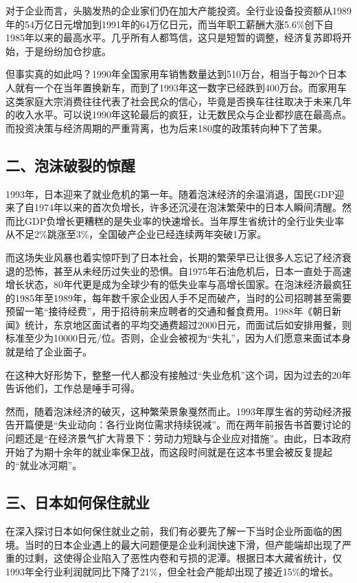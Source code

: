 对于企业而言，头脑发热的企业家们仍在加大产能投资。全行业设备投资额从1989年的54万亿日元增加到1991年的64万亿日元，而当年职工薪酬大涨5.6\%创下自1985年以来的最高水平。几乎所有人都笃信，这只是短暂的调整，经济复苏即将开始，于是纷纷加仓抄底。

但事实真的如此吗？1990年全国家用车销售数量达到510万台，相当于每20个日本人就有一个在当年置换新车，而到了1993年这一数字已经跌到400万台。而家用车这类家庭大宗消费往往代表了社会民众的信心，毕竟是否换车往往取决于未来几年的收入水平。可以说1990年这轮最后的疯狂，让无数民众与企业都抄底在最高点。而投资决策与经济周期的严重背离，也为后来180度的政策转向种下了苦果。

\subsection{二、泡沫破裂的惊醒}

1993年，日本迎来了就业危机的第一年。随着泡沫经济的余温消退，国民GDP迎来了自1974年以来的首次负增长，许多还沉浸在泡沫繁荣中的日本人瞬间清醒。然而比GDP负增长更糟糕的是失业率的快速增长。当年厚生省统计的全行业失业率从不足2\%跳涨至3\%，全国破产企业已经连续两年突破1万家。

而这场失业风暴也着实惊吓到了日本社会，长期的繁荣早已让很多人忘记了经济衰退的恐怖，甚至从未经历过失业的恐惧。自1975年石油危机后，日本一直处于高速增长状态，80年代更是成为全球少有的低失业率与高增长国家。在泡沫经济最疯狂的1985年至1989年，每年数千家企业因人手不足而破产，当时的公司招聘甚至需要预留一笔“接待经费”，用于招待前来应聘者的交通和餐食费用。1988年《朝日新闻》统计，东京地区面试者的平均交通费超过2000日元，而面试后如安排用餐，则标准至少为10000日元/位。否则，企业会被视为“失礼”，因为人们愿意来面试本身就是给了企业面子。

在这种大好形势下，整整一代人都没有接触过“失业危机”这个词，因为过去的20年告诉他们，工作总是唾手可得。

然而，随着泡沫经济的破灭，这种繁荣景象戛然而止。1993年厚生省的劳动经济报告开篇便是“失业动向：各行业岗位需求持续锐减”。而在两年前报告书首要讨论的问题还是“在经济景气扩大背景下：劳动力短缺与企业应对措施”。由此，日本政府开始了为期十余年的就业率保卫战，而这段时间就是在这本书里会被反复提起的“就业冰河期”。

\subsection{三、日本如何保住就业}

在深入探讨日本如何保住就业之前，我们有必要先了解一下当时企业所面临的困境。当时的日本企业遇上的最大问题便是企业利润快速下滑，但产能端却出现了严重的过剩，这使得企业陷入了恶性内卷和亏损的泥潭。根据日本大藏省统计，仅1993年全行业利润就同比下降了21\%，但全社会产能却出现了接近15\%的增长。

